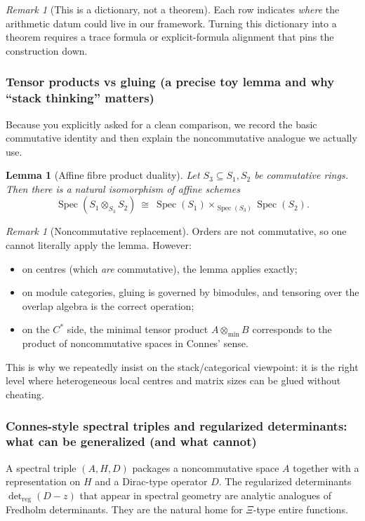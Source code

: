 \documentclass[11pt,oneside]{amsbook}
\numberwithin{equation}{section}
\theoremstyle{plain}
\newtheorem{lemma}[theorem]{Lemma}
\theoremstyle{definition}
\theoremstyle{remark}
\newtheorem{remark}[theorem]{Remark}
\DeclareMathOperator{\Spec}{\mathrm{Spec}}
\begin{document}
\begin{remark}[This is a dictionary, not a theorem]
Each row indicates \emph{where} the arithmetic datum could live in our framework.
Turning this dictionary into a theorem requires a trace formula or explicit-formula alignment that pins the construction down.
\end{remark}

\subsubsection{Tensor products vs gluing (a precise toy lemma and why ``stack thinking'' matters)}

Because you explicitly asked for a clean comparison, we record the basic commutative identity and then explain the noncommutative analogue we actually use.

\begin{lemma}[Affine fibre product duality]
Let $S_3\subseteq S_1,S_2$ be commutative rings.
Then there is a natural isomorphism of affine schemes
\[
\Spec(S_1\otimes_{S_3}S_2)\ \cong\ \Spec(S_1)\times_{\Spec(S_3)}\Spec(S_2).
\]
\end{lemma}

\begin{remark}[Noncommutative replacement]
Orders are not commutative, so one cannot literally apply the lemma.
However:
\begin{itemize}
\item on centres (which \emph{are} commutative), the lemma applies exactly;
\item on module categories, gluing is governed by bimodules, and tensoring over the overlap algebra is the correct operation;
\item on the $C^\ast$ side, the minimal tensor product $A\otimes_{\min}B$ corresponds to the product of noncommutative spaces in Connes' sense.
\end{itemize}
This is why we repeatedly insist on the stack/categorical viewpoint:
it is the right level where heterogeneous local centres and matrix sizes can be glued without cheating.
\end{remark}

\subsubsection{Connes-style spectral triples and regularized determinants: what can be generalized (and what cannot)}

A spectral triple $(A,H,D)$ packages a noncommutative space $A$ together with a representation on $H$ and a Dirac-type operator $D$.
The regularized determinants $\det_{\mathrm{reg}}(D-z)$ that appear in spectral geometry are analytic analogues of Fredholm determinants.
They are the natural home for $\Xi$-type entire functions.
\end{document}
